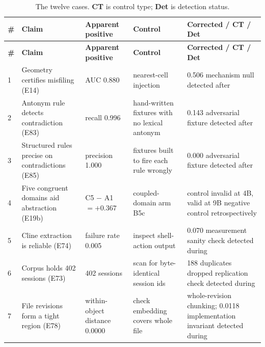 \documentclass[11pt]{article}
\begin{document}
\begin{longtable}{@{}p{0.5cm}p{4.0cm}p{3.4cm}p{3.0cm}p{3.2cm}@{}}
\caption{The twelve cases. \textbf{CT} is control type; \textbf{Det} is
detection status.}\label{tab:catalog}\\
\toprule
\textbf{\#} & \textbf{Claim} & \textbf{Apparent positive} & \textbf{Control} & \textbf{Corrected / CT / Det} \\
\midrule
\endfirsthead
\toprule
\textbf{\#} & \textbf{Claim} & \textbf{Apparent positive} & \textbf{Control} & \textbf{Corrected / CT / Det} \\
\midrule
\endhead
1 & Geometry certifies misfiling (E14) & AUC 0.880 & nearest-cell injection & 0.506 \newline mechanism null \newline detected after \\
2 & Antonym rule detects contradiction (E83) & recall 0.996 & hand-written fixtures with no lexical antonym & 0.143 \newline adversarial fixture \newline detected after \\
3 & Structured rules precise on contradictions (E85) & precision 1.000 & fixtures built to fire each rule wrongly & 0.000 \newline adversarial fixture \newline detected after \\
4 & Five congruent domains aid abstraction (E19b) & C5 $-$ A1 $= +0.367$ & coupled-domain arm B5c & control invalid at 4B, valid at 9B \newline negative control \newline retrospectively \\
5 & Cline extraction is reliable (E74) & failure rate 0.005 & inspect shell-action output & 0.070 \newline measurement sanity check \newline detected during \\
6 & Corpus holds 402 sessions (E73) & 402 sessions & scan for byte-identical session ids & 188 duplicates dropped \newline replication check \newline detected during \\
7 & File revisions form a tight region (E78) & within-object distance 0.0000 & check embedding covers whole file & whole-revision chunking; 0.0118 \newline implementation invariant \newline detected during \\

\end{longtable}
\end{document}
